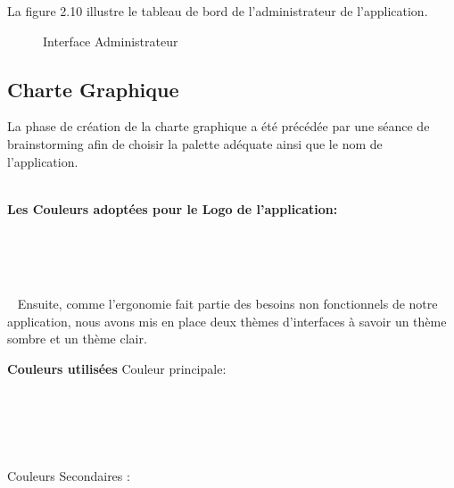 \newpage
La figure 2.10 illustre le tableau de bord de l'administrateur de l'application.
    \begin{figure}[h!]
      \centering
      \caption{Interface Administrateur}
    \end{figure}




  
\subsection{Charte Graphique}

La phase de création de la charte graphique a été précédée par une séance de brainstorming afin de choisir la palette adéquate ainsi que le nom de l’application.
\\\

\textbf{Les Couleurs adoptées pour le Logo de l'application:}
\\\
\newline
\begin{minipage}{0.5\textwidth}
  \begin{tabular}{|c|c|}
    \hline
    \hline
    \hline
  \end{tabular}
\end{minipage}
\begin{minipage}{0.4\textwidth}
  \centering
  \label{fig:image}
\end{minipage}
\\\
\\\
\newline 
Ensuite, comme l’ergonomie fait partie des besoins non fonctionnels de notre application, nous avons mis en place deux thèmes d’interfaces à savoir un thème sombre et un thème clair.


\textbf{Couleurs utilisées}
\newline
Couleur principale: 
\\\
\newline
\begin{center}

\begin{tabular}{|c|c|}
\hline
\hline
\end{tabular}
\\\
\newline 
\end{center}
Couleurs Secondaires :
\\\
\begin{center}
\begin{minipage}{0.45\textwidth}
\centering
\begin{tabular}{|c|c|}
\hline


 \hline
\end{tabular}
\end{minipage}
\end{center}


